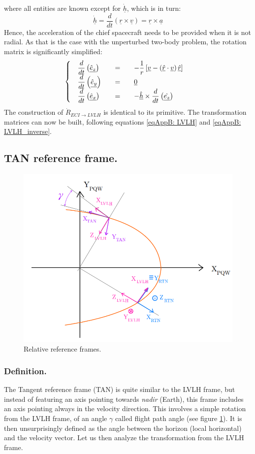 			\noindent where all entities are known except for $\underline{\dot{h}}$, which is in turn:
			\[
			\underline{\dot{h}} = \dfrac{d}{dt} \left(\underline{r}\times \underline{v}\right) = \underline{r} \times \underline{a}
			\]
			\indent Hence, the acceleration of the chief spacecraft needs to be provided when it is not radial. As that is the case with the unperturbed two-body problem, the rotation matrix is significantly simplified:
			\[
			\arraycolsep=10pt
			\def\arraystretch{1.3}
			\left\{ \begin{array}{lllll}
			\dfrac{d}{dt} \left(\underline{\hat{e}_z}\right) 	& = & - \dfrac{1}{r} \left[ \underline{v} - \left(\underline{\hat{r}} \cdot \underline{v}\right)\underline{\hat{r}}\right] \\
			\dfrac{d}{dt} \left(\underline{\hat{e}_y}\right) 	& = & 	\underline{0} \\
			\dfrac{d}{dt} \left(\underline{\hat{e}_x}\right) 	& = & - \underline{\hat{h}} \times \dfrac{d}{dt} \left(\underline{\hat{e_z}}\right) 
			\end{array} \right.
			\]
			\indent The construction of $\dot{R}_{ECI\to LVLH}$	is identical to its primitive. The transformation matrices can now be built, following equations \ref{eqAppB: 	LVLH} and \ref{eqAppB: 	LVLH_inverse}.
			
	\subsection{TAN reference frame.}\label{sec:TAN_frame}
	\begin{figure}[!htb]
	\centering\includegraphics[width = 0.6\linewidth]{Appendices/Appendix_B/RTN_LVLH_TAN}
	\caption{Relative reference frames.}
	\label{fig:	RTN_LVLH_TAN}
	\end{figure}
	\FloatBarrier
		\subsubsection{Definition.}
		\indent The Tangent reference frame (TAN) is quite similar to the LVLH frame, but instead of featuring an axis pointing towards \textit{nadir} (Earth), this frame includes an axis pointing always in the velocity direction. This involves a simple rotation from the LVLH frame, of an angle $\gamma$ called flight path angle (see figure \ref{fig:	RTN_LVLH_TAN}). It is then unsurprisingly defined as the angle between the horizon (local horizontal) and the velocity vector. Let us then analyze the transformation from the LVLH frame.
